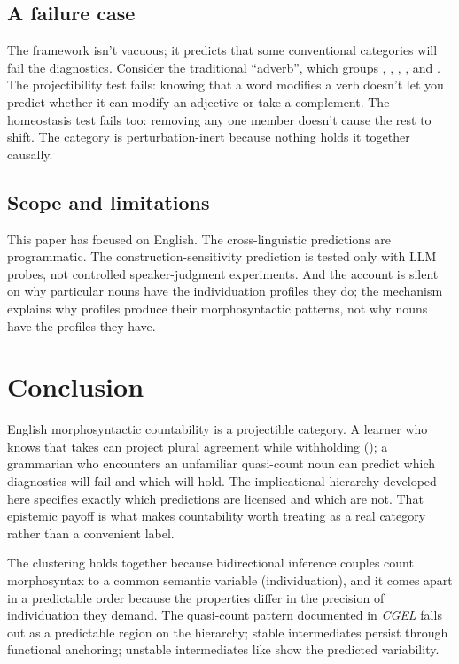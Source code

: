 \documentclass[12pt,a4paper]{article}
\begin{document}
\subsection{A failure case}\label{sec:failure-case}

The framework isn't vacuous; it predicts that some conventional categories will fail the diagnostics. Consider the traditional \enquote{adverb}, which groups , , , , and . The projectibility test fails: knowing that a word modifies a verb doesn't let you predict whether it can modify an adjective or take a complement. The homeostasis test fails too: removing any one member doesn't cause the rest to shift. The category is perturbation-inert because nothing holds it together causally.

\subsection{Scope and limitations}

This paper has focused on English. The cross-linguistic predictions are programmatic. The  construction-sensitivity prediction is tested only with LLM probes, not controlled speaker-judgment experiments. And the account is silent on why particular nouns have the individuation profiles they do; the mechanism explains why profiles produce their morphosyntactic patterns, not why nouns have the profiles they have.

\section{Conclusion}\label{sec:conclusion}

English morphosyntactic countability is a projectible category. A learner who knows that  takes  can project plural agreement while withholding (); a grammarian who encounters an unfamiliar quasi-count noun can predict which diagnostics will fail and which will hold. The implicational hierarchy developed here specifies exactly which predictions are licensed and which are not. That epistemic payoff is what makes countability worth treating as a real category rather than a convenient label.

The clustering holds together because bidirectional inference couples count morphosyntax to a common semantic variable (individuation), and it comes apart in a predictable order because the properties differ in the precision of individuation they demand. The quasi-count pattern documented in \textit{CGEL} falls out as a predictable region on the hierarchy; stable intermediates persist through functional anchoring; unstable intermediates like  show the predicted variability.
\end{document}
